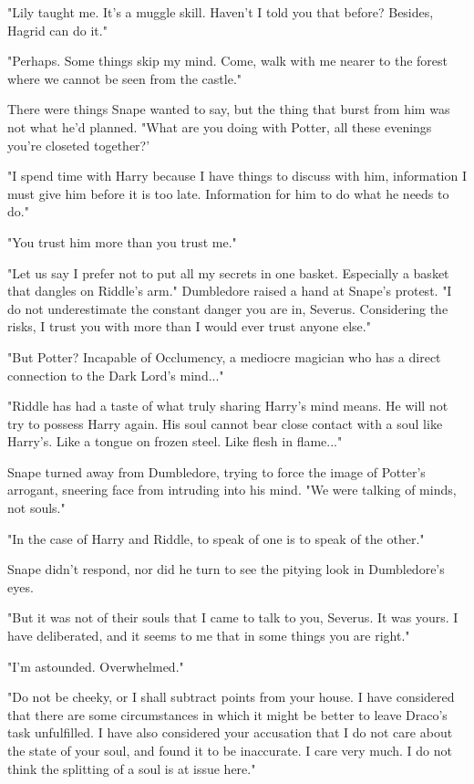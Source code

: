 \documentclass[a4paper,11pt]{article}
\begin{document}
"Lily taught me. It's a muggle skill. Haven't I told you that before? Besides, Hagrid can do it."

"Perhaps. Some things skip my mind. Come, walk with me nearer to the forest where we cannot be seen from the castle."

There were things Snape wanted to say, but the thing that burst from him was not what he'd planned. "What are you doing with Potter, all these evenings you're closeted together?'

"I spend time with Harry because I have things to discuss with him, information I must give him before it is too late. Information for him to do what he needs to do."

"You trust him more than you trust me."

"Let us say I prefer not to put all my secrets in one basket. Especially a basket that dangles on Riddle's arm." Dumbledore raised a hand at Snape's protest. "I do not underestimate the constant danger you are in, Severus. Considering the risks, I trust you with more than I would ever trust anyone else."

"But Potter? Incapable of Occlumency, a mediocre magician who has a direct connection to the Dark Lord's mind..."

"Riddle has had a taste of what truly sharing Harry's mind means. He will not try to possess Harry again. His soul cannot bear close contact with a soul like Harry's. Like a tongue on frozen steel. Like flesh in flame..."

Snape turned away from Dumbledore, trying to force the image of Potter's arrogant, sneering face from intruding into his mind. "We were talking of minds, not souls."

"In the case of Harry and Riddle, to speak of one is to speak of the other."

Snape didn't respond, nor did he turn to see the pitying look in Dumbledore's eyes.

"But it was not of their souls that I came to talk to you, Severus. It was yours. I have deliberated, and it seems to me that in some things you are right."

"I'm astounded. Overwhelmed."

"Do not be cheeky, or I shall subtract points from your house. I have considered that there are some circumstances in which it might be better to leave Draco's task unfulfilled. I have also considered your accusation that I do not care about the state of your soul, and found it to be inaccurate. I care very much. I do not think the splitting of a soul is at issue here."
\end{document}

